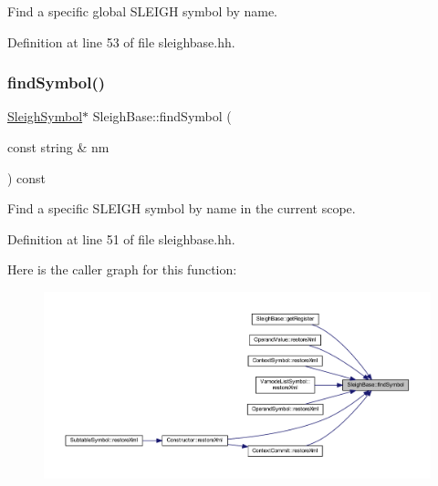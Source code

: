 Find a specific global S\+L\+E\+I\+GH symbol by name. 



Definition at line 53 of file sleighbase.\+hh.

\mbox{\label{class_sleigh_base_ab20a4e83bfe267c5a524327856e8ee54}} 
\subsubsection{\texorpdfstring{findSymbol()}{findSymbol()}\hspace{0.1cm}{\footnotesize\ttfamily [1/2]}}
{\footnotesize\ttfamily \mbox{\hyperlink{class_sleigh_symbol}{Sleigh\+Symbol}}$\ast$ Sleigh\+Base\+::find\+Symbol (\begin{DoxyParamCaption}\item[{const string \&}]{nm }\end{DoxyParamCaption}) const\hspace{0.3cm}{\ttfamily [inline]}}



Find a specific S\+L\+E\+I\+GH symbol by name in the current scope. 



Definition at line 51 of file sleighbase.\+hh.

Here is the caller graph for this function\+:
\nopagebreak
\begin{figure}[H]
\begin{center}
\leavevmode
\includegraphics[width=350pt]{class_sleigh_base_ab20a4e83bfe267c5a524327856e8ee54_icgraph}
\end{center}
\end{figure}
\mbox{\label{class_sleigh_base_a972d77c5f1fe151be99689dc6bbbbb24}} 
